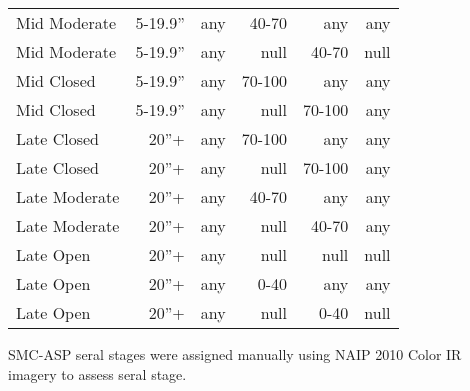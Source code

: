 \begin{table}[hbp]
\begin{tabular}{@{}lrrrrr@{}}
Mid Moderate     & 5-19.9''        & any & 40-70  & any    & any  \\
Mid Moderate     & 5-19.9''        & any & null   & 40-70  & null \\
Mid Closed       & 5-19.9''        & any & 70-100 & any    & any  \\
Mid Closed       & 5-19.9''        & any & null   & 70-100 & any  \\
Late Closed      & 20''+           & any & 70-100 & any    & any  \\
Late Closed      & 20''+           & any & null   & 70-100 & any  \\
Late Moderate    & 20''+           & any & 40-70  & any    & any  \\
Late Moderate    & 20''+           & any & null   & 40-70  & any  \\
Late Open        & 20''+           & any & null   & null   & null \\
Late Open        & 20''+           & any & 0-40   & any    & any  \\
Late Open        & 20''+           & any & null   & 0-40   & null  \\ \bottomrule
\end{tabular}
\end{table}

SMC-ASP seral stages were assigned manually using NAIP 2010 Color IR imagery to assess seral stage.



\clearpage

